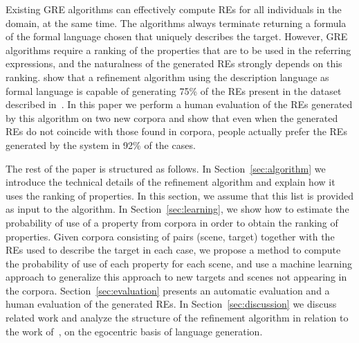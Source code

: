 Existing GRE algorithms can effectively compute REs for all individuals in the domain, at the same time. The algorithms always terminate returning a formula of the formal language chosen that uniquely describes the target. 
However, GRE algorithms require a ranking of the properties that are to be used in the referring expressions, and the naturalness of the generated REs strongly depends on this ranking. \cite{arec:2012:coling12} show that a refinement algorithm using the description language \el as formal language is capable of generating 75\% of the REs present in the dataset described in~\cite{viet:gene11}. In this paper we perform a human evaluation of the REs generated by this algorithm on two new corpora and show that even when the generated REs do not coincide with those found in corpora, people actually prefer the REs generated by the system in 92\% of the cases.  

The rest of the paper is structured as follows. In Section~\ref{sec:algorithm} we introduce the technical details of the 
refinement algorithm and explain how it uses the ranking of properties. In this section, we assume that this list is provided as 
input to the algorithm. In Section~\ref{sec:learning}, we show how to estimate the probability of use of a property from corpora in order to obtain the ranking of properties. Given corpora consisting of pairs (scene, target) together with the REs used to 
describe the target in each case, we propose a method to compute the probability of use of each property for each scene, and use a machine learning approach to generalize this approach to new targets and scenes not appearing in the corpora. Section~\ref{sec:evaluation} presents an automatic evaluation and a human evaluation of the generated REs. In Section~\ref{sec:discussion} we discuss related work and analyze the structure of the refinement algorithm in relation to the work of~\cite{keysar:Curr98}, on the egocentric basis of language generation. 

